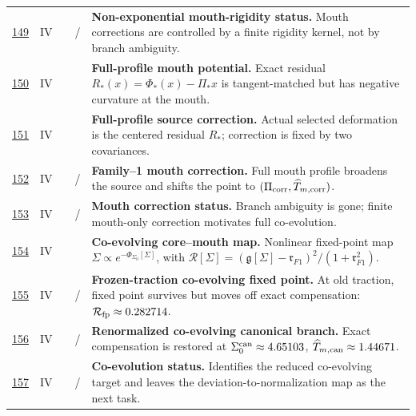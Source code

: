 {\begin{longtable}{@{}L{0.055\textwidth}L{0.075\textwidth}L{0.145\textwidth}L{0.235\textwidth}L{0.43\textwidth}@{}}
\addlinespace
\hyperref[stage:149]{149} & IV &  & \StatusExactClosure{} / \StatusOpen{} & \textbf{Non-exponential mouth-rigidity status.} Mouth corrections are controlled by a finite rigidity kernel, not by branch ambiguity. \\
\addlinespace
\hyperref[stage:150]{150} & IV &  & \StatusExactClosure{} & \textbf{Full-profile mouth potential.} Exact residual \(R_*(x)=\Phi_*(x)-\Pi_*x\) is tangent-matched but has negative curvature at the mouth. \\
\addlinespace
\hyperref[stage:151]{151} & IV &  & \StatusExactClosure{} & \textbf{Full-profile source correction.} Actual selected deformation is the centered residual \(R_*\); correction is fixed by two covariances. \\
\addlinespace
\hyperref[stage:152]{152} & IV &  & \StatusExactClosure{} / \StatusNumerical{} & \textbf{Family--1 mouth correction.} Full mouth profile broadens the source and shifts the point to \((\Pi_{\rm corr},\widehat T_{m,{\rm corr}})\). \\
\addlinespace
\hyperref[stage:153]{153} & IV &  & \StatusExactClosure{} / \StatusOpen{} & \textbf{Mouth correction status.} Branch ambiguity is gone; finite mouth-only correction motivates full co-evolution. \\
\addlinespace
\hyperref[stage:154]{154} & IV &  & \StatusExactClosure{} & \textbf{Co-evolving core--mouth map.} Nonlinear fixed-point map \(\Sigma\propto e^{-\Phi_{\Sigma_0}[\Sigma]}\), with \(\mathcal R[\Sigma]=(\mathfrak g[\Sigma]-\mathfrak r_{F1})^2/(1+\mathfrak r_{F1}^2)\). \\
\addlinespace
\hyperref[stage:155]{155} & IV &  & \StatusNumerical{} / \StatusExactClosure{} & \textbf{Frozen-traction co-evolving fixed point.} At old traction, fixed point survives but moves off exact compensation: \(\mathcal R_{\rm fp}\approx0.282714\). \\
\addlinespace
\hyperref[stage:156]{156} & IV &  & \StatusNumerical{} / \StatusExactClosure{} & \textbf{Renormalized co-evolving canonical branch.} Exact compensation is restored at \(\Sigma_0^{\rm can}\approx4.65103\), \(\widehat T_{m,{\rm can}}\approx1.44671\). \\
\addlinespace
\hyperref[stage:157]{157} & IV &  & \StatusNumerical{} / \StatusOpen{} & \textbf{Co-evolution status.} Identifies the reduced co-evolving target and leaves the deviation-to-normalization map as the next task. \\

\end{longtable}}
